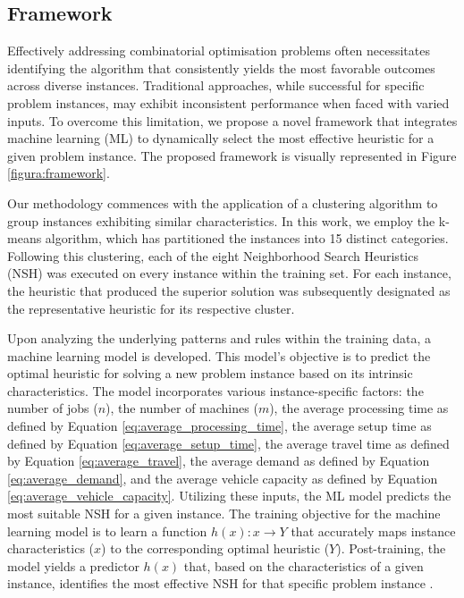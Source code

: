 \documentclass{article}
\begin{document}
\subsection{Framework}
\label{subsec:Framework}
Effectively addressing combinatorial optimisation problems often necessitates identifying the algorithm that consistently yields the most favorable outcomes across diverse instances. Traditional approaches, while successful for specific problem instances, may exhibit inconsistent performance when faced with varied inputs. To overcome this limitation, we propose a novel framework that integrates machine learning (ML) to dynamically select the most effective heuristic for a given problem instance. The proposed framework is visually represented in Figure \ref{figura:framework}.

Our methodology commences with the application of a clustering algorithm to group instances exhibiting similar characteristics. In this work, we employ the k-means algorithm, which has partitioned the instances into 15 distinct categories. Following this clustering, each of the eight Neighborhood Search Heuristics (NSH) was executed on every instance within the training set. For each instance, the heuristic that produced the superior solution was subsequently designated as the representative heuristic for its respective cluster.

Upon analyzing the underlying patterns and rules within the training data, a machine learning model is developed. This model's objective is to predict the optimal heuristic for solving a new problem instance based on its intrinsic characteristics. The model incorporates various instance-specific factors: the number of jobs ($n$), the number of machines ($m$), the average processing time as defined by Equation \ref{eq:average_processing_time}, the average setup time as defined by Equation \ref{eq:average_setup_time}, the average travel time as defined by Equation \ref{eq:average_travel}, the average demand as defined by Equation \ref{eq:average_demand}, and the average vehicle capacity as defined by Equation \ref{eq:average_vehicle_capacity}. Utilizing these inputs, the ML model predicts the most suitable NSH for a given instance. The training objective for the machine learning model is to learn a function $h(x): x \rightarrow Y$ that accurately maps instance characteristics ($x$) to the corresponding optimal heuristic ($Y$). Post-training, the model yields a predictor $h(x)$ that, based on the characteristics of a given instance, identifies the most effective NSH for that specific problem instance \citep{de2022heuristics}.
\end{document}
